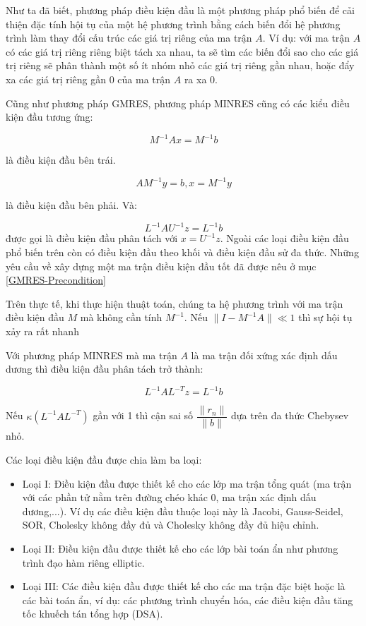 \documentclass[14pt, a4paper]{article}
\numberwithin{equation}{section}
\numberwithin{algorithm}{section}
\numberwithin{figure}{section}
\numberwithin{dl}{section}
\numberwithin{md}{section}
\numberwithin{bd}{section}
\numberwithin{dn}{section}
\numberwithin{hq}{section}
\begin{document}
Như ta đã biết, phương pháp điều kiện đầu là một phương pháp phổ biến để cải thiện đặc tính hội tụ của một hệ phương trình bằng cách biến đổi hệ phương trình làm thay đổi cấu trúc các giá trị riêng của ma trận $A$.
Ví dụ: với ma trận $A$ có các giá trị riêng riêng biệt tách xa nhau, ta sẽ tìm các biến đổi sao cho các giá trị riêng sẽ phân thành một số ít nhóm nhỏ các giá trị riêng gần nhau, hoặc đẩy xa các giá trị riêng gần 0 của ma trận $A$ ra xa 0.

Cũng như phương pháp GMRES, phương pháp MINRES cũng có các kiểu điều kiện đầu tương ứng:

\begin{equation}
    M^{-1}Ax = M^{-1}b
\end{equation}

là điều kiện đầu bên trái.

\begin{equation}
    AM^{-1}y = b, x = M^{-1}y
\end{equation}

là điều kiện đầu bên phải. Và:

\begin{equation}
    L^{-1}AU^{-1}z = L^{-1}b
\end{equation}
được gọi là điều kiện đầu phân tách với $x = U^{-1}z$.
Ngoài các loại điều kiện đầu phổ biến trên còn có điều kiện đầu theo khối và điều kiện đầu sử đa thức.
Những yêu cầu về xây dựng một ma trận điều kiện đầu tốt đã được nêu ở mục \ref{GMRES-Precondition}

Trên thực tế, khi thực hiện thuật toán, chúng ta hệ phương trình với ma trận điều kiện đầu $M$ mà không cần tính $M^{-1}$.
Nếu $\lVert I - M^{-1} A \rVert \ll 1$ thì sự hội tụ xảy ra rất nhanh

Với phương pháp MINRES mà ma trận $A$ là ma trận đối xứng xác định dấu dương thì điều kiện đầu phân tách trở thành:

\begin{equation}
    L^{-1}A L^{-T} z = L^{-1}b
\end{equation}

Nếu $\kappa(L^{-1}AL^{-T})$ gần với 1 thì cận sai số $\dfrac{\lVert r_n \rVert}{\lVert b \rVert}$ dựa trên đa thức Chebysev nhỏ.

Các loại điều kiện đầu được chia làm ba loại:

\begin{itemize}
    \item Loại I: Điều kiện đầu được thiết kế cho các lớp ma trận tổng quát (ma trận với các phần tử nằm trên đường chéo khác 0, ma trận xác định dấu dương,...). Ví dụ các điều kiện đầu thuộc loại này là Jacobi, Gauss-Seidel, SOR, Cholesky không đầy đủ và Cholesky không đầy đủ hiệu chỉnh.
    \item Loại II: Điều kiện đầu được thiết kế cho các lớp bài toán ẩn như phương trình đạo hàm riêng elliptic.
    \item Loại III: Các điều kiện đầu được thiết kế cho các ma trận đặc biệt hoặc là các bài toán ẩn, ví dụ: các phương trình chuyển hóa, các điều kiện đầu tăng tốc khuếch tán tổng hợp (DSA).
\end{itemize}
\end{document}
